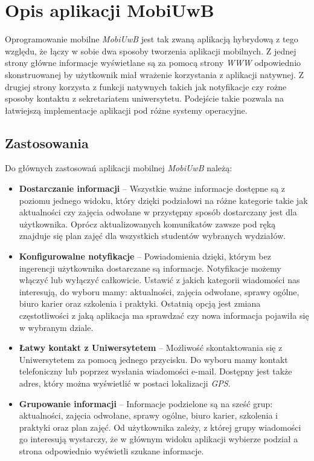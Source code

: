 \documentclass{iiuwb}
\begin{document}
\section{Opis aplikacji MobiUwB}
Oprogramowanie mobilne \textit{MobiUwB} jest tak zwaną aplikacją hybrydową z tego względu, że łączy w sobie dwa sposoby tworzenia aplikacji mobilnych. Z jednej strony główne informacje wyświetlane są za pomocą strony \textit{WWW} odpowiednio skonstruowanej by użytkownik miał wrażenie korzystania z aplikacji natywnej. Z drugiej strony korzysta z funkcji natywnych takich jak notyfikacje czy rożne sposoby kontaktu z sekretariatem uniwersytetu. Podejście takie pozwala na łatwiejszą implementacje aplikacji pod różne systemy operacyjne.
\subsection{Zastosowania}
Do głównych zastosowań aplikacji mobilnej \textit{MobiUwB} należą:
\begin{itemize}
\item \textbf{Dostarczanie informacji} -- Wszystkie ważne informacje dostępne są z poziomu jednego widoku, który dzięki podziałowi na różne kategorie takie jak aktualności czy zajęcia odwołane w przystępny sposób dostarczany jest dla użytkownika. Oprócz aktualizowanych komunikatów zawsze pod ręką znajduje się plan zajęć dla wszystkich studentów wybranych wydziałów.
\item \textbf{Konfigurowalne notyfikacje} -- Powiadomienia dzięki, którym bez ingerencji użytkownika dostarczane są informacje. Notyfikacje możemy włączyć lub wyłączyć całkowicie. Ustawić z jakich kategorii wiadomości nas interesują, do wyboru mamy: aktualności, zajęcia odwołane, sprawy ogólne, biuro karier oraz szkolenia i praktyki. Ostatnią opcją jest zmiana częstotliwości z jaką aplikacja ma sprawdzać czy nowa informacja pojawiła się w wybranym dziale.
\item \textbf{Łatwy kontakt z Uniwersytetem} -- Możliwość skontaktowania się z Uniwersytetem za pomocą jednego przycisku. Do wyboru mamy kontakt telefoniczny lub poprzez wysłania wiadomości e-mail. Dostępny jest także adres, który można wyświetlić w postaci lokalizacji \textit{GPS}.
\item \textbf{Grupowanie informacji} -- Informacje podzielone są na sześć grup: aktualności, zajęcia odwołane, sprawy ogólne, biuro karier, szkolenia i praktyki oraz plan zajęć. Od użytkownika zależy, z której grupy wiadomości go interesują wystarczy, że w głównym widoku aplikacji wybierze podział a strona odpowiednio wyświetli szukane informacje.
\end{itemize}
\end{document}

